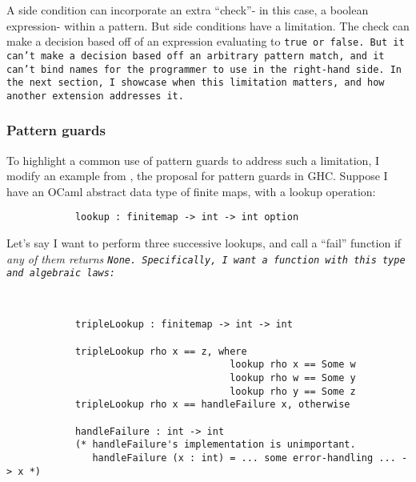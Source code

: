 \documentclass[manuscript,screen,review, 12pt, nonacm]{acmart}
\begin{document}
    A side condition can incorporate an extra “check”- in this case, a boolean
    expression- within a pattern. But side conditions have a limitation. The
    check can make a decision based off of an expression evaluating to \tt{true}
    or \tt{false}. But it can't make a decision based off an arbitrary pattern
    match, and it can't bind names for the programmer to use in the right-hand
    side. In the next section, I showcase when this limitation matters, and how
    another extension addresses it. 

    \subsubsection{Pattern guards}
    \label{guards}

    To highlight a common use of pattern guards to address such a limitation, I
    modify an example from \citet{guardproposal}, the proposal for pattern
    guards in GHC. Suppose I have an OCaml abstract data type of finite maps,
    with a lookup operation: 

    \begin{minipage}[t]{\textwidth}
        \centering 
        \begin{verbatim}
            lookup : finitemap -> int -> int option
        \end{verbatim}
    \end{minipage}
    Let's say I want to perform three successive lookups, and call a “fail”
    function if \it{any} of them returns \tt{None}. Specifically, I want a
    function with this type and algebraic laws: 

    \begin{minipage}[t]{\textwidth}
        \centering 
        \begin{verbatim}
          

            tripleLookup : finitemap -> int -> int

            tripleLookup rho x == z, where 
                                       lookup rho x == Some w
                                       lookup rho w == Some y
                                       lookup rho y == Some z
            tripleLookup rho x == handleFailure x, otherwise
            
            handleFailure : int -> int 
            (* handleFailure's implementation is unimportant.
               handleFailure (x : int) = ... some error-handling ... -> x *)  

        \end{verbatim}
    \end{minipage}
\end{document}
